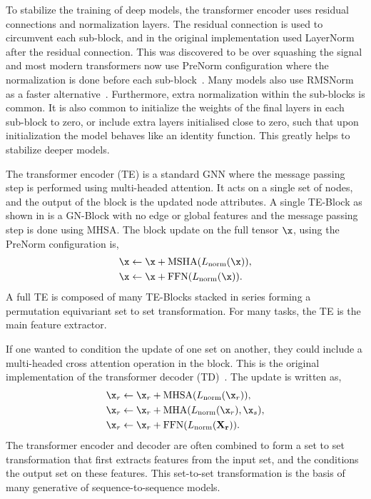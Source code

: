 To stabilize the training of deep models, the transformer encoder uses residual connections and normalization layers.
The residual connection is used to circumvent each sub-block, and in the original implementation used LayerNorm~ after the residual connection.
This was discovered to be over squashing the signal and most modern transformers now use PreNorm configuration where the normalization is done before each sub-block~.
Many models also use RMSNorm as a faster alternative~.
Furthermore, extra normalization within the sub-blocks is common.
It is also common to initialize the weights of the final layers in each sub-block to zero, or include extra layers initialised close to zero, such that upon initialization the model behaves like an identity function.
This greatly helps to stabilize deeper models.

The transformer encoder (TE) is a standard GNN where the message passing step is performed using multi-headed attention.
It acts on a single set of nodes, and the output of the block is the updated node attributes.
A single TE-Block as shown in  is a GN-Block with no edge or global features and the message passing step is done using MHSA.
The block update on the full tensor $\x$, using the PreNorm configuration is,
\begin{equation}
\begin{aligned}
    \x & \leftarrow \x + \text{MSHA}(L_\text{norm}(\x)), \\
    \x & \leftarrow \x + \text{FFN}(L_\text{norm}(\x)).
\end{aligned}
\end{equation}
A full TE is composed of many TE-Blocks stacked in series forming a permutation equivariant set to set transformation.
For many tasks, the TE is the main feature extractor.

If one wanted to condition the update of one set on another, they could include a multi-headed cross attention operation in the block.
This is the original implementation of the transformer decoder (TD)~.
The update is written as,
\begin{equation}
\begin{aligned}
    \x_r & \leftarrow \x_r + \text{MHSA}(L_\text{norm}(\x_r)), \\
    \x_r & \leftarrow \x_r + \text{MHA}(L_\text{norm}(\x_r), \x_s), \\
    \x_r & \leftarrow \x_r + \text{FFN}(L_\text{norm}(\mathbf{X_r})).
\end{aligned}
\end{equation}
The transformer encoder and decoder are often combined to form a set to set transformation that first extracts features from the input set, and the conditions the output set on these features.
This set-to-set transformation is the basis of many generative of sequence-to-sequence models.

